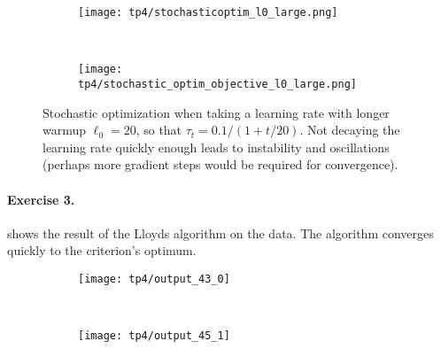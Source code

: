 \documentclass{article}
\numberwithin{equation}{section}
\theoremstyle{definition}
\begin{document}
\begin{figure}
	\begin{subfigure}{.49\linewidth}
		\centering
		\texttt{[image: tp4/stochasticoptim\_l0\_large.png]}
		\caption{}
	\end{subfigure}~
	\begin{subfigure}{.49\linewidth}
		\centering
		\texttt{[image: tp4/stochastic\_optim\_objective\_l0\_large.png]}
		\caption{}
	\end{subfigure}
	\caption{Stochastic optimization when taking a learning rate with longer warmup $\ell_0 = 20$, so that $\tau_t = 0.1/ (1+t/20)$. Not decaying the learning rate quickly enough leads to instability and oscillations (perhaps more gradient steps would be required for convergence).}\label{fig:TP4StochasticOptimLargeWarmup}	
\end{figure}



\paragraph{Exercise 3.}  shows the result of the Lloyds algorithm on the data. The algorithm converges quickly to the criterion's optimum.
\begin{figure}
	\begin{subfigure}{.49\linewidth}
		\centering
		\texttt{[image: tp4/output\_43\_0]}
		\caption{}
		\label{fig:output430}
	\end{subfigure}~
	\begin{subfigure}{.49\linewidth}
		\centering
		\texttt{[image: tp4/output\_45\_1]}
		\caption{}
		\label{fig:output451}
	\end{subfigure}
	\caption{}\label{fig:OptimalQuantization}
\end{figure}
\end{document}
